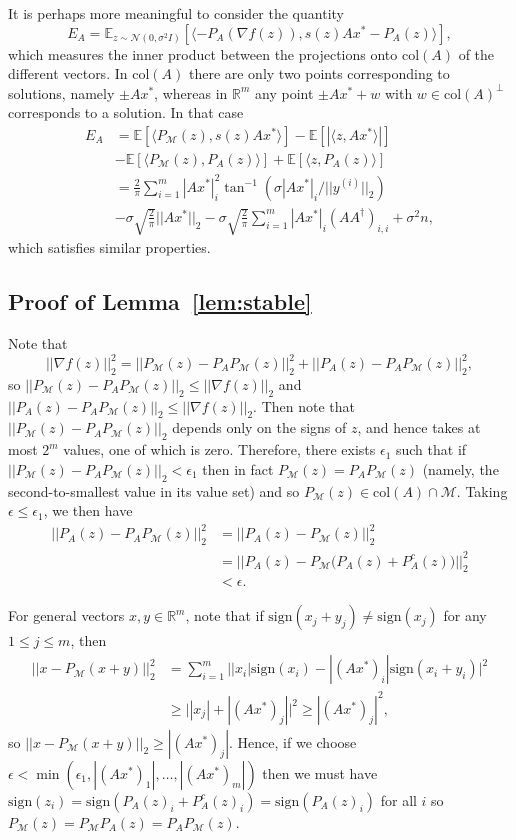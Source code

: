 \documentclass[journal]{IEEEtran}
\theoremstyle{definition}
\theoremstyle{remark}
\theoremstyle{definition}
\theoremstyle{problem}
\theoremstyle{definition}
\newcommand{\col}{\text{col}}
\newcommand{\sign}{\text{sign}}
\newcommand{\atan}{\tan^{-1}}
\newcommand{\RR}{\mathbb{R} }
\newcommand{\MM}{\mathcal{M}}
\newcommand{\EE}{\mathbb{E}}
\begin{document}
It is perhaps more meaningful to consider the quantity
\[E_A = \EE_{z\sim \mathcal{N}(0,\sigma^2I)}\left[\langle -P_A(\nabla f(z)), s(z)Ax^*-P_A(z)\rangle\right],\]
which measures the inner product between the projections onto $\col(A)$ of the different vectors. In $\col(A)$ there are only two points corresponding to solutions, namely $\pm Ax^*$, whereas in $\RR^m$ any point $\pm Ax^* + w$ with $w\in\col(A)^{\perp}$ corresponds to a solution. In that case
\[\begin{aligned} E_A &= \EE[\langle P_{\MM}(z), s(z)Ax^*\rangle] - \EE[|\langle z,Ax^*\rangle|] \\&- \EE[\langle P_{\MM}(z), P_A(z)\rangle] + \EE[\langle z,P_A(z)\rangle]\\
&= \frac{2}{\pi}\sum_{i=1}^m|Ax^*|_i^2\atan(\sigma|Ax^*|_i/||y^{(i)}||_2) \\
& - \sigma\sqrt{\frac{2}{\pi}}||Ax^*||_2- \sigma\sqrt{\frac{2}{\pi}}\sum_{i=1}^m|Ax^*|_i(AA^{\dagger})_{i,i} + \sigma^2n,\end{aligned}\]
which satisfies similar properties.

\subsection{Proof of Lemma~\ref{lem:stable}}
\label{sec:pf_stable}

Note that
\[||\nabla f(z)||_2^2 = ||P_{\MM}(z) - P_AP_{\MM}(z)||_2^2 + ||P_A(z) - P_AP_{\MM}(z)||_2^2,\]
so $||P_{\MM}(z) - P_AP_{\MM}(z)||_2\leq ||\nabla f(z)||_2$ and $||P_A(z) - P_AP_{\MM}(z)||_2\leq ||\nabla f(z)||_2$. Then note that $||P_{\MM}(z) - P_AP_{\MM}(z)||_2$ depends only on the signs of $z$, and hence takes at most $2^m$ values, one of which is zero. Therefore, there exists $\epsilon_1$ such that if $||P_{\MM}(z) - P_AP_{\MM}(z)||_2<\epsilon_1$ then in fact $P_{\MM}(z) = P_AP_{\MM}(z)$ (namely, the second-to-smallest value in its value set) and so $P_{\MM}(z)\in\col(A)\cap\MM$. Taking $\epsilon\leq \epsilon_1$, we then have
\[\begin{aligned} ||P_A(z) - P_AP_{\MM}(z)||_2^2 &= ||P_A(z) - P_{\MM}(z)||_2^2 \\&= ||P_A(z) - P_{\MM}\Big(P_A(z) + P_A^c(z)\Big)||_2^2 \\&<\epsilon.\end{aligned} \]

For general vectors $x,y\in\RR^m$, note that if $\sign(x_j+y_j)\neq \sign(x_j)$ for any $1\leq j\leq m$, then
\[\begin{aligned} ||x - P_{\MM}(x+y)||_2^2 &= \sum_{i=1}^m\Big||x_i|\sign(x_i) - |(Ax^*)_i|\sign(x_i+y_i)\Big|^2 \\& \geq \Big| |x_j| + |(Ax^*)_j|\Big|^2 \geq |(Ax^*)_j|^2,\end{aligned}\]
so $||x-P_{\MM}(x+y)||_2\geq |(Ax^*)_j|$.
Hence, if we choose $\epsilon<\min(\epsilon_1, |(Ax^*)_1|,\ldots,|(Ax^*)_m|)$ then we must have $\sign(z_i)=\sign(P_A(z)_i + P_A^c(z)_i) = \sign(P_A(z)_i)$ for all $i$ so $P_{\MM}(z) = P_{\MM}P_A(z) = P_AP_{\MM}(z)$.
\end{document}
